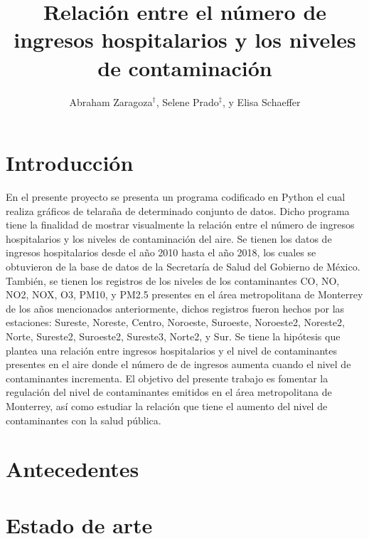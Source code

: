 \documentclass{sciposter}
\title{Relación entre el número de ingresos hospitalarios y los niveles de contaminación}
\author{Abraham Zaragoza$^\dagger$, Selene Prado$^\ddagger$, y Elisa Schaeffer}
\institute {Posgrado en Ingeniería de Sistemas}
\begin{document}

\maketitle
\begin{abstract}
\end{abstract}

\begin{multicols}{2} 

\section{Introducción}

En el presente proyecto se presenta un programa codificado en Python el cual realiza gráficos de telaraña de determinado conjunto de datos. Dicho programa tiene la finalidad de mostrar visualmente la relación entre el número de ingresos hospitalarios y los niveles de contaminación del aire.
Se tienen los datos de ingresos hospitalarios desde el año 2010 hasta el año 2018, los cuales se obtuvieron de la base de datos de la Secretaría de Salud del Gobierno de México. También, se tienen los registros de los niveles de los contaminantes CO, NO, NO2, NOX, O3, PM10, y PM2.5 presentes en el área metropolitana de Monterrey de los años mencionados anteriormente, dichos registros fueron hechos por las estaciones: Sureste, Noreste, Centro, Noroeste, Suroeste, Noroeste2, Noreste2, Norte, Sureste2, Suroeste2, Sureste3, Norte2, y Sur.
Se tiene la hipótesis que plantea una relación entre ingresos hospitalarios y el nivel de contaminantes presentes en el aire donde el número de de ingresos aumenta cuando el nivel de contaminantes incrementa. 
El objetivo del presente trabajo es fomentar la regulación del nivel de contaminantes emitidos en el área metropolitana de Monterrey, así como estudiar la relación que tiene el aumento del nivel de contaminantes con la salud pública.

\section{Antecedentes}


\section{Estado de arte}


\end{multicols}
\end{document}
